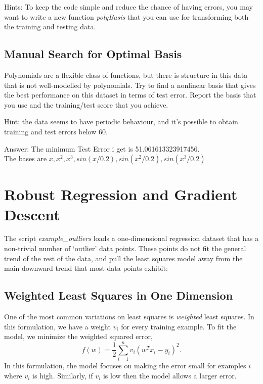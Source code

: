 \documentclass{article}
\def\ans#1{\par\gre{Answer: #1}}
\def\blu#1{{\color{blu}#1}}
\def\gre#1{{\color{gre}#1}}
\newcommand{\centerfig}[2]{\begin{center}\texttt{[image: a3f/\#2]}\end{center}}
\begin{document}
Hints: To keep the code simple and reduce the chance of having errors, you may want to write a new function \emph{polyBasis} that you can use for transforming both the training and testing data. 



\subsection{Manual Search for Optimal Basis}

Polynomials are a flexible class of functions, but there is structure in this data that is not well-modelled by polynomials. Try to find a nonlinear basis that gives the best performance on this dataset in terms of test error. \blu{Report the basis that you use and the training/test score that you achieve}.

Hint: the data seems to have periodic behaviour, and it's possible to obtain training and test errors below 60.
\ans{The minimum Test Error i get is 51.061613323917456. \\
The bases are $x, x^2, x^3, sin(x/0.2), sin(x^2/0.2), sin(x^3/0.2)$ }
\section{Robust Regression and Gradient Descent}

The script \emph{example\_outliers} loads a one-dimensional regression dataset that has a non-trivial number of `outlier' data points. These points do not fit the general trend of the rest of the data, and pull the least squares model away from the main downward trend that most data points exhibit:




\subsection{Weighted Least Squares in One Dimension}

One of the most common variations on least squares is \emph{weighted} least squares. In this formulation, we have a weight $v_i$ for every training example. To fit the model, we minimize the weighted squared error,
\[
f(w) =  \frac{1}{2}\sum_{i=1}^n v_i(w^Tx_i - y_i)^2.
\]
In this formulation, the model focuses on making the error small for examples $i$ where $v_i$ is high. Similarly, if $v_i$ is low then the model allows a larger error.
\end{document}
